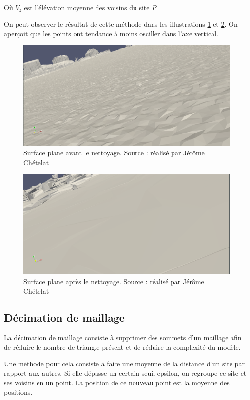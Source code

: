 Où $\overline{V_z}$ est l'élévation moyenne des voisins du site $P$

On peut observer le résultat de cette méthode dans les illustrations \ref{fig:before_las_filter} et
\ref{fig:after_las_filter}.
On aperçoit que les points ont tendance à moins osciller dans l'axe vertical.

\begin{figure}[htbp!]
    \centering
    \includegraphics[width=0.8\linewidth]{figures/lissage_brut.png}
    \caption{Surface plane avant le nettoyage. Source : réalisé par Jérôme Chételat}
    \label{fig:before_las_filter}
\end{figure}
\begin{figure}[htbp!]
    \centering
    \includegraphics[width=0.8\linewidth]{figures/lissage_filtrer.png}
    \caption{Surface plane après le nettoyage. Source : réalisé par Jérôme Chételat}
    \label{fig:after_las_filter}
\end{figure}

\subsection{Décimation de maillage}

La décimation de maillage consiste à supprimer des sommets d'un maillage afin
de réduire le nombre de triangle présent et de réduire la complexité du modèle.

Une méthode pour cela consiste à faire une moyenne de la distance d'un site par
rapport aux autres. Si elle dépasse un certain seuil epsilon, on regroupe ce
site et ses voisins en un point. La position de ce nouveau point est la moyenne
des positions.

